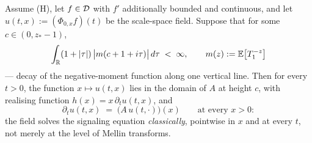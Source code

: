 \begin{corollary}\label{cor:signaling-classical}
Assume (H), let $f \in \mathcal{D}$ with $f'$ additionally bounded and continuous, and let
$u(t,x) := (\Phi_{0,x}f)(t)$ be the scale-space field. Suppose that for some $c \in (0,z_*-1)$,
\[
\int_{\mathbb{R}} (1+|\tau|)\,\bigl|m(c+1+i\tau)\bigr|\,d\tau \;<\; \infty, \qquad m(z) := \mathbb{E}\bigl[T_1^{-z}\bigr]
\]
--- decay of the negative-moment function along one vertical line. Then for every $t > 0$, the
function $x \mapsto u(t,x)$ lies in the domain of $A$ at height $c$, with realising function
$h(x) = x\,\partial_t u(t,x)$, and
\[
\partial_t u(t,x) \;=\; \bigl(A\,u(t,\cdot)\bigr)(x) \qquad \text{at every } x > 0:
\]
the field solves the signaling equation \emph{classically}, pointwise in $x$ and at every $t$, not
merely at the level of Mellin transforms.
\end{corollary}

